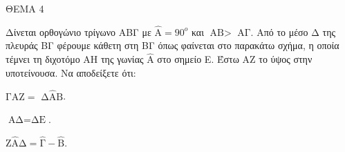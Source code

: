 
ΘΕΜΑ 4

Δίνεται ορθογώνιο τρίγωνο ΑΒΓ με $\widehat{\text{Α}} = 90^{ο}$ και $\text{ΑΒ} >$ $\text{ΑΓ}$. Από το μέσο Δ της πλευράς ΒΓ φέρουμε κάθετη στη ΒΓ όπως φαίνεται στο παρακάτω σχήμα, η οποία τέμνει τη διχοτόμο ΑΗ της γωνίας $\widehat{\text{Α}}$ στο σημείο Ε. Έστω ΑΖ το ύψος στην υποτείνουσα. Να αποδείξετε ότι:

\begin{alist}
\item $\text{Γ}\widehat{\text{Α}}\text{Ζ} =$ $\text{Δ}\widehat{\text{Α}}\text{Β}$.


\item $\text{ΑΔ} = \text{ΔΕ}$.


\item $\text{Ζ}\widehat{\text{Α}}\text{Δ} = \widehat{\text{Γ}} - \widehat{\text{Β}}$.



\end{alist}

